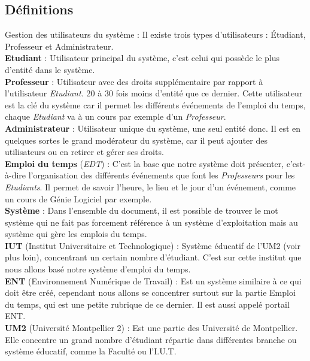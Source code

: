 \documentclass[a4paper, 11pt]{article}
\begin{document}
        \subsection{ Définitions}
        Gestion des utilisateurs du système : Il existe trois types d'utilisateurs : Étudiant, Professeur et Administrateur.
        \\\textbf{Etudiant} : Utilisateur principal du système, c'est celui qui possède le plus d'entité dans le système.
        \\\textbf{Professeur} : Utilisateur avec des droits supplémentaire par rapport à l'utilisateur \textit{Etudiant. }20 à 30 fois moins d'entité que ce dernier. Cette utilisateur est la clé du système car il permet les différents événements de l'emploi du temps, chaque \textit{Etudiant} va à un cours par exemple d'un \textit{Professeur}.
        \\\textbf{Administrateur} : Utilisateur unique du système, une seul entité donc. Il est en quelques sortes le grand modérateur du système, car il peut ajouter des utilisateurs ou en retirer et gérer ses droits.
        \\\textbf{Emploi du temps} (\textit{EDT}) : C'est la base que notre système doit présenter, c'est-à-dire l'organisation des différents événements que font les \textit{Professeurs} pour les \textit{Etudiants}. Il permet de savoir l'heure, le lieu et le jour d'un événement, comme un cours de Génie Logiciel par exemple.
        \\\textbf{Système} : Dans l'ensemble du document, il est possible de trouver le mot système qui ne fait pas forcement référence à un système d'exploitation mais au système qui gère les emplois du temps.
        \\\textbf{IUT} (Institut Universitaire et Technologique) : Système éducatif de l'UM2 (voir plus loin), concentrant un certain nombre d'étudiant. C'est sur cette institut que nous allons basé notre système d'emploi du temps.
        \\\textbf{ENT} (Environnement Numérique de Travail) : Est un système similaire à ce qui doit être créé, cependant nous allons se concentrer surtout sur la partie Emploi du temps, qui est une petite rubrique de ce dernier. Il est aussi appelé portail ENT.
        \\\textbf{UM2} (Université Montpellier 2) : Est une partie des Université de Montpellier. Elle concentre un grand nombre d'étudiant répartie dans différentes branche ou système éducatif, comme la Faculté ou l'I.U.T. 
\end{document}
